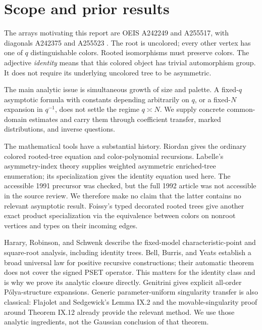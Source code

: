 \documentclass[11pt]{article}
\theoremstyle{definition}
\begin{document}
\section{Scope and prior results}\label{mct:sec:scope}%
The arrays motivating this report are OEIS A242249 and A255517, with diagonals A242375 and A255523 \cite{oeisall,oeisid,oeisdiagall,oeisdiagid}. The root is uncolored; every other vertex has one of $q$ distinguishable colors. Rooted isomorphisms must preserve colors. The adjective \emph{identity} means that this colored object has trivial automorphism group. It does not require its underlying uncolored tree to be asymmetric.

The main analytic issue is simultaneous growth of size and palette. A fixed-$q$ asymptotic formula with constants depending arbitrarily on $q$, or a fixed-$N$ expansion in $q^{-1}$, does not settle the regime $q\asymp N$. We supply concrete common-domain estimates and carry them through coefficient transfer, marked distributions, and inverse questions.

The mathematical tools have a substantial history. Riordan \cite{riordan} gives the ordinary colored rooted-tree equation and color-polynomial recursions. Labelle's asymmetry-index theory \cite{labelle1991,labelle1992} supplies weighted asymmetric enriched-tree enumeration; its specialization gives the identity equation used here. The accessible 1991 precursor was checked, but the full 1992 article was not accessible in the source review. We therefore make no claim that the latter contains no relevant asymptotic result. Foissy's typed decorated rooted trees \cite{foissy} give another exact product specialization via the equivalence between colors on nonroot vertices and types on their incoming edges.

Harary, Robinson, and Schwenk \cite{hrs} describe the fixed-model characteristic-point and square-root analysis, including identity trees. Bell, Burris, and Yeats \cite{bby} establish a broad universal law for positive recursive constructions; their automatic theorem does not cover the signed PSET operator. This matters for the identity class and is why we prove its analytic closure directly. Genitrini \cite{genitrini} gives explicit all-order P\'olya-structure expansions. Generic parameter-uniform singularity transfer is also classical: Flajolet and Sedgewick's Lemma IX.2 and the movable-singularity proof around Theorem IX.12 \cite{fs} already provide the relevant method. We use those analytic ingredients, not the Gaussian conclusion of that theorem.
\end{document}
